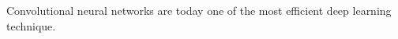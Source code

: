 \documentclass[../3.tex]{subfiles}
\begin{document}
    Convolutional neural networks are today one of the most efficient deep learning technique.
\end{document}
